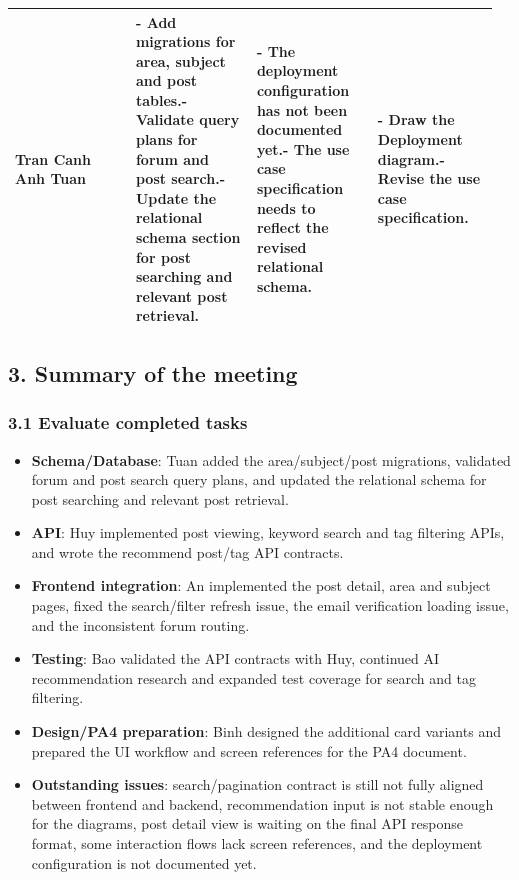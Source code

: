 \documentclass[12pt]{article}
\begin{document}
\begin{longtable}{|p{0.24\linewidth}|p{0.24\linewidth}|p{0.24\linewidth}|p{0.24\linewidth}|}
\hline
\textbf{Tran Canh Anh Tuan} & - Add migrations for area, subject and post tables.\newline- Validate query plans for forum and post search.\newline- Update the relational schema section for post searching and relevant post retrieval. & - The deployment configuration has not been documented yet.\newline- The use case specification needs to reflect the revised relational schema. & - Draw the Deployment diagram.\newline- Revise the use case specification. \\
\hline
\end{longtable}

\subsection{3. Summary of the meeting}

\subsubsection{3.1 Evaluate completed tasks}

\begin{itemize}

\item \textbf{Schema/Database}: Tuan added the area/subject/post migrations, validated forum and post search query plans, and updated the relational schema for post searching and relevant post retrieval.

\item \textbf{API}: Huy implemented post viewing, keyword search and tag filtering APIs, and wrote the recommend post/tag API contracts.

\item \textbf{Frontend integration}: An implemented the post detail, area and subject pages, fixed the search/filter refresh issue, the email verification loading issue, and the inconsistent forum routing.

\item \textbf{Testing}: Bao validated the API contracts with Huy, continued AI recommendation research and expanded test coverage for search and tag filtering.

\item \textbf{Design/PA4 preparation}: Binh designed the additional card variants and prepared the UI workflow and screen references for the PA4 document.

\item \textbf{Outstanding issues}: search/pagination contract is still not fully aligned between frontend and backend, recommendation input is not stable enough for the diagrams, post detail view is waiting on the final API response format, some interaction flows lack screen references, and the deployment configuration is not documented yet.

\end{itemize}
\end{document}
